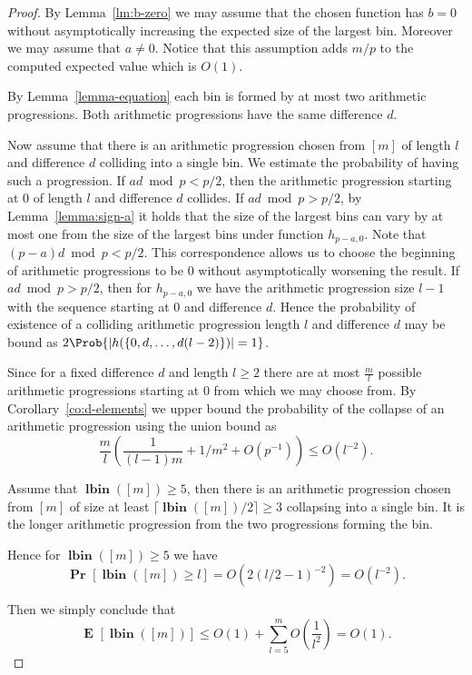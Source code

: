 \documentclass{article}
\newcommand{\vlbin}[1]{\operatorname{\mathbf{lbin}}({#1})}
\newcommand{\probs}[2]{\operatorname{\mathbf{Pr}}_{{#1}}\left[{#2}\right]}
\newcommand{\prob}[1]{\probs{}{#1}}
\newcommand{\expects}[2]{\operatorname{\mathbf{E}}_{{#1}}\left[{#2}\right]}
\newcommand{\expect}[1]{\expects{}{#1}}
\begin{document}
\begin{proof}
By Lemma~\ref{lm:b-zero} we may assume that the chosen function has $b = 0$ without asymptotically increasing the expected size of the largest bin. Moreover we may assume that $a \neq 0$. Notice that this assumption adds $m/p$ to the computed expected value which is $O(1)$.

By Lemma~\ref{lemma-equation} each bin is formed by at most two arithmetic progressions. Both arithmetic progressions have the same difference $d$.

Now assume that there is an arithmetic progression chosen from $[m]$ of length $l$ and difference $d$ colliding into a single bin.
We estimate the probability of having such a progression.
If $ad \bmod p < p/2$, then the arithmetic progression starting at $0$ of length $l$ and difference $d$ collides. 
If $ad \bmod p > p/2$, by Lemma~\ref{lemma:sign-a} it holds that the size of the largest bins can vary by at most one from the size of the largest bins under function $h_{p - a, 0}$. 
Note that $(p - a)d \bmod p < p/2$.
This correspondence allows us to choose the beginning of arithmetic progressions to be $0$ without asymptotically worsening the result.
If $ad \bmod p > p / 2$, then for $h_{p - a, 0}$ we have the arithmetic progression size $l - 1$ with the sequence starting at $0$ and difference $d$.
Hence the probability of existence of a colliding arithmetic progression length $l$ and difference $d$ may be bound as $2\Prob{|h(\{0, d, \dots, d(l-2)\})| = 1}$.

Since for a fixed difference $d$ and length $l \geq 2$ there are at most $\frac{m}{l}$ possible arithmetic progressions starting at $0$ from which we may choose from. By Corollary~\ref{co:d-elements} we upper bound the probability of the collapse of an arithmetic progression using the union bound as 
\[
\frac{m}{l} \left(\frac{1}{(l - 1)m} + 1/m^2 + O(p^{-1})\right) \leq O(l^{-2}).
\]

Assume that $\vlbin{[m]} \geq 5$, then there is an arithmetic progression chosen from $[m]$ of size at least $\lceil \vlbin{[m]}/2 \rceil \geq 3$ collapsing into a single bin.
It is the longer arithmetic progression from the two progressions forming the bin. 

Hence for $\vlbin{[m]} \geq 5$ we have
\[
\prob{\vlbin{[m]} \geq l} = O(2(l / 2 - 1)^{-2}) = O(l^{-2}).
\]

Then we simply conclude that
\[
\expect{\vlbin{[m]}} \leq O(1) + \sum_{l = 5}^m O\left(\frac{1}{l^2}\right) = O(1).
\]

\end{proof}
\end{document}
